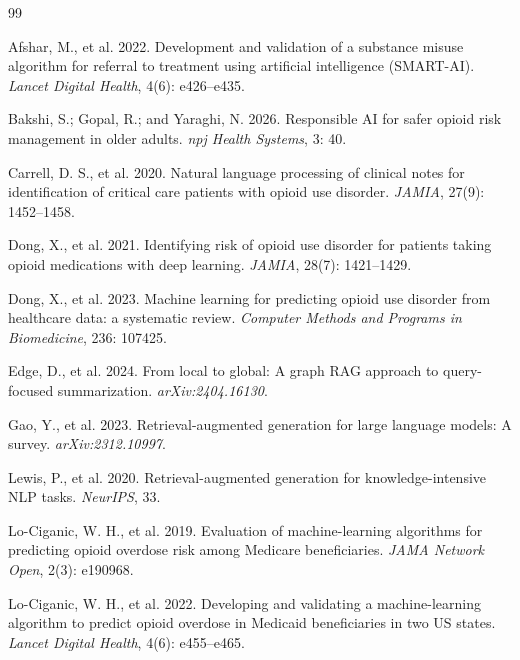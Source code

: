 \documentclass[letterpaper]{article}
\begin{document}
\small

\begin{thebibliography}{99}

 Afshar, M., et al. 2022. Development and validation of a substance misuse algorithm for referral to treatment using artificial intelligence (SMART-AI). \emph{Lancet Digital Health}, 4(6): e426--e435.

 Bakshi, S.; Gopal, R.; and Yaraghi, N. 2026. Responsible AI for safer opioid risk management in older adults. \emph{npj Health Systems}, 3: 40.

 Carrell, D. S., et al. 2020. Natural language processing of clinical notes for identification of critical care patients with opioid use disorder. \emph{JAMIA}, 27(9): 1452--1458.

 Dong, X., et al. 2021. Identifying risk of opioid use disorder for patients taking opioid medications with deep learning. \emph{JAMIA}, 28(7): 1421--1429.

 Dong, X., et al. 2023. Machine learning for predicting opioid use disorder from healthcare data: a systematic review. \emph{Computer Methods and Programs in Biomedicine}, 236: 107425.

 Edge, D., et al. 2024. From local to global: A graph RAG approach to query-focused summarization. \emph{arXiv:2404.16130}.

 Gao, Y., et al. 2023. Retrieval-augmented generation for large language models: A survey. \emph{arXiv:2312.10997}.

 Lewis, P., et al. 2020. Retrieval-augmented generation for knowledge-intensive NLP tasks. \emph{NeurIPS}, 33.

 Lo-Ciganic, W. H., et al. 2019. Evaluation of machine-learning algorithms for predicting opioid overdose risk among Medicare beneficiaries. \emph{JAMA Network Open}, 2(3): e190968.

 Lo-Ciganic, W. H., et al. 2022. Developing and validating a machine-learning algorithm to predict opioid overdose in Medicaid beneficiaries in two US states. \emph{Lancet Digital Health}, 4(6): e455--e465.


\end{thebibliography}
\end{document}
